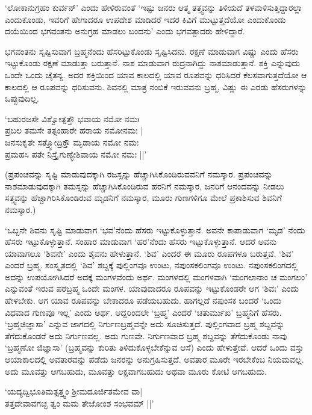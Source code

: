 `ಲೋಕಾನುಗ್ರಹಂ ಕುರ್ವನ್' ಎಂದು ಹೇಳಿರುವಂತೆ `ಇಷ್ಟು ಜನರು ಆತ್ಮ ತತ್ತ್ವವನ್ನು ತಿಳಿಯದೆ ತಳಮಳಿಸುತ್ತಿದ್ದಾರಲ್ಲಾ ಎಂದುಕೊಂಡು, ಇವರಿಗೆ ಹೇಗಾದರೂ ಉಪದೇಶ ಮಾಡಿದರೆ ಇದರ ಕಿವಿಗೆ ಮುಟ್ಟುತ್ತದೆಯೋ ಎಂದುಕೊಂಡು ದಯೆಯಿಂದ ಭಗವಂತನು ಅನುಗ್ರಹ ಮಾಡಲು ಬಂದನು' ಎಂದು ಭಗವತ್ಪಾದರು ಹೇಳಿದ್ದಾರೆ.


ಭಗವಂತನು ಸೃಷ್ಟಿಸುವಾಗ ಬ್ರಹ್ಮನೆಂದು ಹೆಸರಿಟ್ಟುಕೊಂಡು ಸೃಷ್ಟಿಸಿದನು. ರಕ್ಷಣೆ ಮಾಡುವಾಗ ವಿಷ್ಣು ಎಂದು ಹೆಸರು ಇಟ್ಟುಕೊಂಡು ರಕ್ಷಣೆ ಮಾಡುತ್ತಾ ಬರುತ್ತಾನೆ. ನಾಶ ಮಾಡುವಾಗ ರುದ್ರನಾಗಿದ್ದು ನಾಶಮಾಡುತ್ತಾನೆ. ಶಕ್ತಿ ಎನ್ನುವುದು ಒಂದೇ ಒಂದು ಚೈತನ್ಯ. ಅದರ ಶಕ್ತಿಯಿಂದ ಯಾವ ಕಾಲದಲ್ಲಿ ಯಾವ ರೂಪವನ್ನು ಧರಿಸಿದರೆ ಕೆಲಸವಾಗುತ್ತದೆಯೋ ಆ ಕಾಲದಲ್ಲಿ ಆ ರೂಪವನ್ನು ಧರಿಸುವನು. ಶಿವನಲ್ಲಿ ಮಾತ್ರ ನಂಬಿಕೆ ಇರುವವನು ಬ್ರಹ್ಮ, ವಿಷ್ಣು ಈ ಎರಡು ಹೆಸರುಗಳನ್ನು ಒಪ್ಪುವುದಿಲ್ಲ.


\begin{shloka}
`ಬಹುರಜಸೇ ವಿಶ್ವೋತ್ಪತ್ತೌ ಭವಾಯ ನಮೋ ನಮಃ\\
ಪ್ರಬಲ ತಮಸೇ ತತ್ಸಂಹಾರೇ ಹರಾಯ ನಮೋನಮಃ‌ |\\
ಜನಸುಕೃತೇ ಸತ್ತ್ವೋದ್ರಿಕ್ತೌ ಮೃಡಾಯ ನಮೋ ನಮಃ\\
ಪ್ರಮಹಸಿ ಪತೇ ನಿಸ್ತ್ರೈಗುಣ್ಯೇಶಿವಾಯ ನಮೋ ನಮಃ ||'
\end{shloka}

(ಪ್ರಪಂಚವನ್ನು ಸೃಷ್ಟಿ ಮಾಡುವುದಕ್ಕಾಗಿ ರಜಸ್ಸನ್ನು ಹೆಚ್ಚಾಗಿಸಿಕೊಂಡಿರುವವನಿಗೆ ನಮಸ್ಕಾರ. ಪ್ರಪಂಚವನ್ನು ನಾಶಮಾಡುವುದಕ್ಕಾಗಿ ತಮಸ್ಸನ್ನು ಹೆಚ್ಚಾಗಿಸಿಕೊಂಡಿರುವ ಹರನಿಗೆ ನಮಸ್ಕಾರ, ಜನರಿಗೆ ಆನಂದವನ್ನು ನೀಡಲು ಸತ್ತ್ವವನ್ನು ಹೆಚ್ಚಾಗಿರಿಸಿಕೊಂಡಿರುವ ಮೃಡನಿಗೆ ನಮಸ್ಕಾರ, ಮೂರು ಗುಣಗಳಿಗೂ ಮೇಲೆ ಪ್ರಕಾಶಿಸುವ ಶಿವನಿಗೆ ನಮಸ್ಕಾರ.)


`ಒಬ್ಬನೇ ಶಿವನು ಸೃಷ್ಟಿ ಮಾಡುವಾಗ `ಭವ'ನೆಂದು ಹೆಸರು ಇಟ್ಟುಕೊಳ್ಳುತ್ತಾನೆ. ಅವನೇ ಕಾಪಾಡುವಾಗ `ಮೃಡ' ನೆಂದು ಹೆಸರು ಇಟ್ಟುಕೊಳ್ಳುತ್ತಾನೆ. ಸಂಹಾರ ಮಾಡುವಾಗ `ಹರ'ನೆಂದು ಹೆಸರು ಇಟ್ಟುಕೊಳ್ಳುತ್ತಾನೆ. ಆದರೆ ಅವನು ಯಾವಾಗಲೂ `ಶಿವನೇ' ಎಂದು ಶೈವನು ಹೇಳುತ್ತಾನೆ. `ಶಿವ' ಎಂದರೆ ಈ ಮೂರು ರೂಪಗಳೂ ಬರುತ್ತವೆ. `ಶಿವ' ಎಂದರೆ ಬ್ರಹ್ಮ. ಸಂಸ್ಕೃತದಲ್ಲಿ `ಶಿವ' ಶಬ್ದಕ್ಕೆ ಪುಲ್ಲಿಂಗವೂ ಉಂಟು, ನಪುಂಸಕಲಿಂಗವೂ ಉಂಟು. ನಪುಂಸಕಲಿಂಗದಲ್ಲಿ ಅದನ್ನು ಉಪಯೋಗಿಸಿದರೆ ಅದಕ್ಕೆ ಮಂಗಳವೆಂದು ಅರ್ಥ. ಮಂಗಳದಲ್ಲಿ ಮಂಗಳವಾಗಿ `ಮಂಗಲಾನಾಂ ಚ ಮಂಗಲಂ' ಎನ್ನುವಂತೆ ಇರುವ ಪರಬ್ರಹ್ಮ ಒಂದೇ ಮಂಗಳ. ಯಾವುದಾದರೂ ರೂಪವನ್ನು ಇಟ್ಟುಕೊಂಡರೇ ಆಗ `ಶಿವಃ' ಎಂದು ಹೇಳಬೇಕು. ಆಗ ಯಾವ ರೂಪವನ್ನು ಬೇಕಾದರೂ ಪಡೆಯಬಹುದು. ಹಾಗಲ್ಲದೆ ನಪುಂಸಕ ಬಂದರೆ `ಒಂದು ವಿಧವಾದ ಗುಣವೂ ಇಲ್ಲ' ಎಂದು ಅರ್ಥ. ಆದ್ದರಿಂದಲೇ `ಬ್ರಹ್ಮ' ಎಂದರೆ `ಚತುರ್ಮುಖ' ಬ್ರಹ್ಮನಿಗೆ ಹೆಸರು. `ಬ್ರಹ್ಮಜಿಜ್ಞಾಸಾ' ಎನ್ನುವ ಜಾಗದಲ್ಲಿ ನಿರ್ಗುಣಬ್ರಹ್ಮವನ್ನೇ ಅದು ಸೂಚಿಸುತ್ತದೆ. ಪುಲ್ಲಿಂಗವಾದ ಬ್ರಹ್ಮ ಶಬ್ದವನ್ನು ತೆಗೆದುಕೊಂಡರೆ ಅದು ನಿರ್ಗುಣವಲ್ಲ. ಅದು ಗುಣವೇ. ನಿರ್ಗುಣವಾದ ಬ್ರಹ್ಮ ಶಬ್ದವನ್ನು ತೆಗೆದುಕೊಂಡು ನಾವು `ಬ್ರಹ್ಮಣೋ ಜಿಜ್ಞಾಸಾ' (ಬ್ರಹ್ಮವನ್ನು ಕುರಿತು ತಿಳಿದುಕೊಳ್ಳಬೇಕೆನ್ನುವ ಆಸೆ) ಎಂದು ಹೇಳುತ್ತೇವೆ. ಆದರೆ ಒಂದು ವಸ್ತು ಆಯಾಕಾಲದಲ್ಲಿ ಅವತಾರವನ್ನು ಪಡೆದು ಜನರನ್ನು ಅನುಗ್ರಹಿಸುತ್ತದೆ. ಅವತಾರ ಮೂರೇ ಇರಬೇಕೆಂಬ ನಿಯಮವಲ್ಲ. ಅದು ಮೂವತ್ತು ಆಗಬಹುದು, ಮೂವತ್ತು ಲಕ್ಷವಾಗಬಹುದು ಅಥವಾ ಮೂರು ಕೋಟಿ ಆಗಬಹುದು.

\begin{shloka}
`ಯದ್ಯದ್ವಿಭೂತಿಮತ್ಸತ್ತ್ವಂ ಶ್ರೀಮದೂರ್ಜಿತಮೇವ ವಾ‌|\\
ತತ್ತದೇವಾವಗಚ್ಛ ತ್ವಂ ಮಮ ತೇಜೋಂಶ ಸಂಭವಮ್ ||'
\end{shloka}

